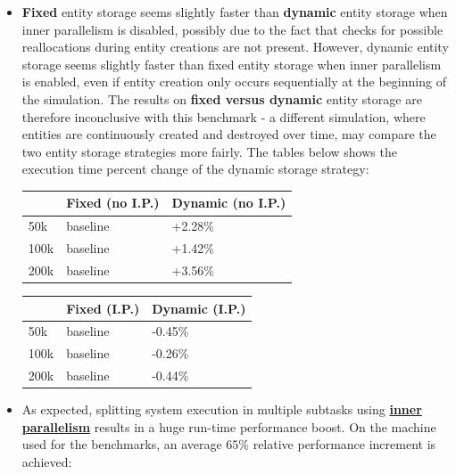 \documentclass[oneside, 12pt, a4paper, openany]{book}
\begin{document}
\begin{itemize}
\item
  \textbf{Fixed} entity storage seems slightly faster than
  \textbf{dynamic} entity storage when inner parallelism is disabled,
  possibly due to the fact that checks for possible reallocations during
  entity creations are not present. However, dynamic entity storage
  seems slightly faster than fixed entity storage when inner parallelism
  is enabled, even if entity creation only occurs sequentially at the
  beginning of the simulation. The results on \textbf{fixed versus
  dynamic} entity storage are therefore inconclusive with this benchmark
  - a different simulation, where entities are continuously created and
  destroyed over time, may compare the two entity storage strategies
  more fairly. The tables below shows the execution time percent change
  of the dynamic storage strategy:

  \begin{longtable}[]{@{}lll@{}}
  \toprule
  \begin{minipage}[b]{0.32\columnwidth}\raggedright\strut
  \strut
  \end{minipage} &
  \begin{minipage}[b]{0.32\columnwidth}\raggedright\strut
  Fixed (no I.P.)\strut
  \end{minipage} &
  \begin{minipage}[b]{0.32\columnwidth}\raggedright\strut
  Dynamic (no I.P.)\strut
  \end{minipage}\tabularnewline
  \midrule
  \endhead
  50k & baseline & +2.28\%\tabularnewline
  100k & baseline & +1.42\%\tabularnewline
  200k & baseline & +3.56\%\tabularnewline
  \bottomrule
  \end{longtable}

  \begin{longtable}[]{@{}lll@{}}
  \toprule
  \begin{minipage}[b]{0.32\columnwidth}\raggedright\strut
  \strut
  \end{minipage} &
  \begin{minipage}[b]{0.32\columnwidth}\raggedright\strut
  Fixed (I.P.)\strut
  \end{minipage} &
  \begin{minipage}[b]{0.32\columnwidth}\raggedright\strut
  Dynamic (I.P.)\strut
  \end{minipage}\tabularnewline
  \midrule
  \endhead
  50k & baseline & -0.45\%\tabularnewline
  100k & baseline & -0.26\%\tabularnewline
  200k & baseline & -0.44\%\tabularnewline
  \bottomrule
  \end{longtable}
\item
  As expected, splitting system execution in multiple subtasks using
  \protect\hyperlink{multithreading_inner_par}{\textbf{inner
  parallelism}} results in a huge run-time performance boost. On the
  machine used for the benchmarks, an average \(65\)\% relative
  performance increment is achieved:


\end{itemize}
\end{document}
